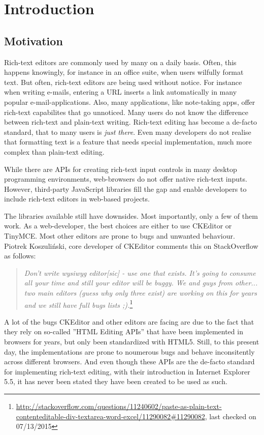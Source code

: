 \chapter{Introduction}
\section{Motivation}

Rich-text editors are commonly used by many on a daily basis. Often, this happens knowingly, for instance in an office suite, when users wilfully format text. But often, rich-text editors are being used without notice. For instance when writing e-mails, entering a URL inserts a link automatically in many popular e-mail-applications. Also, many applications, like note-taking apps, offer rich-text capabilites that go unnoticed. Many users do not know the difference between rich-text and plain-text writing. Rich-text editing has become a de-facto standard, that to many users is \textit{just there}. Even many developers do not realise that formatting text is a feature that needs special implementation, much more complex than plain-text editing.

While there are APIs for creating rich-text input controls in many desktop programming environments, web-browsers do not offer native rich-text inputs. However, third-party JavaScript libraries fill the gap and enable developers to include rich-text editors in web-based projects.

The libraries available still have downsides. Most importantly, only a few of them work. As a web-developer, the best choices are either to use CKEditor or TinyMCE. Most other editors are prone to bugs and unwanted behaviour. Piotrek Koszuli\'{n}ski, core developer of CKEditor comments this on StackOverflow as follows:

\begin{quotation}
\textit{Don't write wysiwyg editor[sic] - use one that exists. It's going to consume all your time and still your editor will be buggy. We and guys from other... two main editors (guess why only three exist) are working on this for years and we still have full bugs lists ;).}\footnote{\url{http://stackoverflow.com/questions/11240602/paste-as-plain-text-contenteditable-div-textarea-word-excel/11290082#11290082}, last checked on 07/13/2015}
\end{quotation}

A lot of the bugs CKEditor and other editors are facing are due to the fact that they rely on so-called ''HTML Editing APIs'' that have been implemented in browsers for years, but only been standardized with HTML5. Still, to this present day, the implementations are prone to noumerous bugs and behave inconsitently across different browsers. And even though these APIs are the de-facto standard for implementing rich-text editing, with their introduction in Internet Explorer 5.5, it has never been stated they have been created to be used as such.

